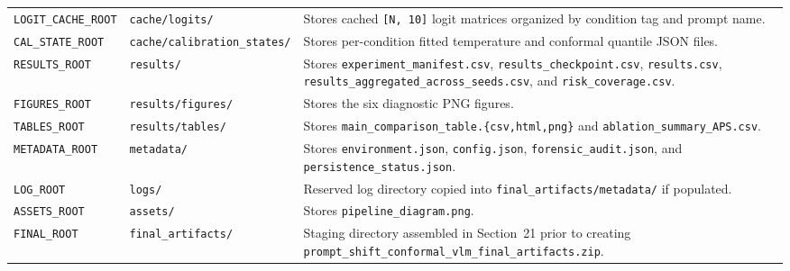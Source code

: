 \documentclass[11pt,a4paper]{article}
\begin{document}
\begin{table}[!htbp]
\begin{tabularx}{\textwidth}{l l Y}
\texttt{LOGIT\_\allowbreak{}CACHE\_\allowbreak{}ROOT} & \texttt{cache/\allowbreak{}logits/\allowbreak{}} & Stores cached \texttt{[N, 10]} logit matrices organized by condition tag and prompt name. \\
\texttt{CAL\_\allowbreak{}STATE\_\allowbreak{}ROOT} & \texttt{cache/\allowbreak{}calibration\_\allowbreak{}states/\allowbreak{}} & Stores per-condition fitted temperature and conformal quantile JSON files. \\
\texttt{RESULTS\_\allowbreak{}ROOT} & \texttt{results/\allowbreak{}} & Stores \texttt{experiment\_\allowbreak{}manifest.csv}, \texttt{results\_\allowbreak{}checkpoint.csv}, \texttt{results.csv}, \texttt{results\_\allowbreak{}aggregated\_\allowbreak{}across\_\allowbreak{}seeds.csv}, and \texttt{risk\_\allowbreak{}coverage.csv}. \\
\texttt{FIGURES\_\allowbreak{}ROOT} & \texttt{results/\allowbreak{}figures/\allowbreak{}} & Stores the six diagnostic PNG figures. \\
\texttt{TABLES\_\allowbreak{}ROOT} & \texttt{results/\allowbreak{}tables/\allowbreak{}} & Stores \texttt{main\_comparison\_table.\{csv,html,png\}} and \texttt{ablation\_\allowbreak{}summary\_\allowbreak{}APS.csv}. \\
\texttt{METADATA\_\allowbreak{}ROOT} & \texttt{metadata/\allowbreak{}} & Stores \texttt{environment.json}, \texttt{config.json}, \texttt{forensic\_\allowbreak{}audit.json}, and \texttt{persistence\_\allowbreak{}status.json}. \\
\texttt{LOG\_\allowbreak{}ROOT} & \texttt{logs/\allowbreak{}} & Reserved log directory copied into \texttt{final\_\allowbreak{}artifacts/\allowbreak{}metadata/\allowbreak{}} if populated. \\
\texttt{ASSETS\_\allowbreak{}ROOT} & \texttt{assets/\allowbreak{}} & Stores \texttt{pipeline\_\allowbreak{}diagram.png}. \\
\texttt{FINAL\_\allowbreak{}ROOT} & \texttt{final\_\allowbreak{}artifacts/\allowbreak{}} & Staging directory assembled in Section~21 prior to creating \texttt{prompt\_\allowbreak{}shift\_\allowbreak{}conformal\_\allowbreak{}vlm\_\allowbreak{}final\_\allowbreak{}artifacts.zip}. \\
\bottomrule
\end{tabularx}
\end{table}
\end{document}

